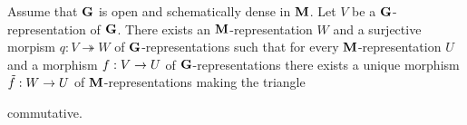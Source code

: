 \begin{theorem}\label{theorem:monoid_representations_are_reflective_subcategory_in_representations_of_units_group}
Assume that $\mathbf{G}$ is open and schematically dense in $\mathbf{M}$. Let $V$ be a $\mathbf{G}$-representation of $\mathbf{G}$. There exists an $\mathbf{M}$-representation $W$ and a surjective morpism $q:V\twoheadrightarrow W$ of $\mathbf{G}$-representations such that for every $\mathbf{M}$-representation $U$ and a morphism $f:V\rightarrow U$ of $\mathbf{G}$-representations there exists a unique morphism $\tilde{f}:W\rightarrow U$ of $\mathbf{M}$-representations making the triangle
\begin{center}
\end{center}
commutative.
\end{theorem}
